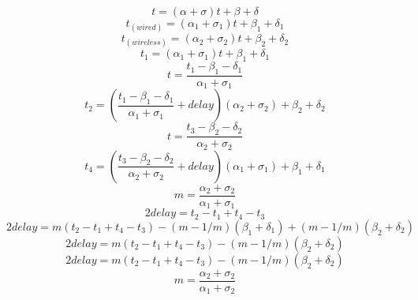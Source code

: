 \documentclass[conference]{IEEEtran}
\begin{document}
	\begin{equation}
	t=(\alpha +\sigma)t+\beta+\delta  \nonumber
	\end{equation}
	\begin{equation}
	t_(wired)=(\alpha _1+\sigma _1)t+\beta _1+\delta _1  \nonumber
	\end{equation}
	\begin{equation*}
	t_(wireless)=(\alpha _2+\sigma _2)t+\beta _2+\delta _2 \nonumber
	\end{equation*}
	\begin{equation}
	t_1=(\alpha _1+\sigma _1)t+\beta _1+\delta _1 \nonumber
	\end{equation}
	\begin{equation}
	t=\frac{t_1- \beta _1- \delta _1}{\alpha_1 + \sigma_1} \nonumber
	\end{equation}
	\begin{equation}
	t_2=(\frac{t_1- \beta _1- \delta _1}{\alpha_1 + \sigma_1}+delay)(\alpha_2+\sigma_2)+\beta_2+\delta_2 \nonumber
	\end{equation}
	\begin{equation}
	t=\frac{t_3-\beta_2-\delta_2}{\alpha_2+\sigma_2} \nonumber
	\end{equation}
	\begin{equation}
	t_4=(\frac{t_3-\beta_2-\delta_2}{\alpha_2+\sigma_2}+delay)(\alpha_1+\sigma_1)+\beta_1+\delta_1 \nonumber
	\end{equation}
	\begin{equation}
	m=\frac{\alpha_2+\sigma_2}{\alpha_1+\sigma_1} \nonumber
	\end{equation}
	\begin{equation}
	2delay=t_2-t_1+t_4-t_3 \nonumber
	\end{equation}
	\begin{equation}
	2delay=m(t_2-t_1+t_4-t_3)-(m-1/m)(\beta_1+\delta_1)+(m-1/m)(\beta_2+\delta_2) \nonumber
	\end{equation}
	\begin{equation}
	2delay=m(t_2-t_1+t_4-t_3)-(m-1/m)(\beta_2+\delta_2) \nonumber
	\end{equation}
	\begin{equation}
	2delay=m(t_2-t_1+t_4-t_3)-(m-1/m)(\beta_2+\delta_2) \nonumber
	\end{equation}
	\begin{equation}
	m=\frac{\alpha_2+\sigma_2}{\alpha_1+\sigma_2} \nonumber
	\end{equation}
	
\end{document}
